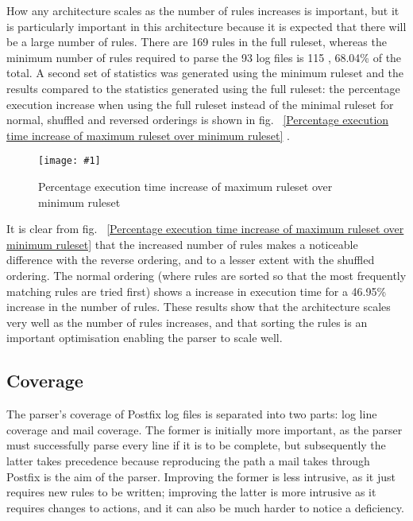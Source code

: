 \documentclass[draft]{svmult}
\newcommand{\showgraph}[3]{%
    \begin{figure}[hbt!]
        \caption{#2}\label{#3}
        \texttt{[image: \#1]}
    \end{figure}
}
\newcommand{\refwithpage}[1]{%
    \empty{}\vref{#1}%
}
\newcommand{\numberOFlogFILES}[0]{%
    93%
}
\newcommand{\numberOFrules}[0]{%
    169%
}
\newcommand{\numberOFrulesMINIMUM}[0]{%
    115%
}
\newcommand{\numberOFrulesMINIMUMpercentage}[0]{%
    68.04\%%
}
\newcommand{\numberOFrulesMAXIMUMpercentage}[0]{%
    46.95\%%
}
\begin{document}
How any architecture scales as the number of rules increases is important,
but it is particularly important in this architecture because it is
expected that there will be a large number of rules.  There are
\numberOFrules{} rules in the full ruleset, whereas the minimum number of
rules required to parse the \numberOFlogFILES{} log files is
\numberOFrulesMINIMUM{}, \numberOFrulesMINIMUMpercentage{} of the total.  A
second set of statistics was generated using the minimum ruleset and the
results compared to the statistics generated using the full ruleset: the
percentage execution increase when using the full ruleset instead of the
minimal ruleset for normal, shuffled and reversed orderings is shown in
fig.~\refwithpage{Percentage execution time increase of maximum ruleset
over minimum ruleset}.  \showgraph{build/plot-normal-vs-smaller}{Percentage
execution time increase of maximum ruleset over minimum ruleset}{Percentage
execution time increase of maximum ruleset over minimum ruleset}

It is clear from fig.~\refwithpage{Percentage execution time increase of
maximum ruleset over minimum ruleset} that the increased number of rules
makes a noticeable difference with the reverse ordering, and to a lesser
extent with the shuffled ordering.  The normal ordering (where rules are
sorted so that the most frequently matching rules are tried first) shows a
 increase in
execution time for a \numberOFrulesMAXIMUMpercentage{} increase in the
number of rules.  These results show that the architecture scales very well
as the number of rules increases, and that sorting the rules is an
important optimisation enabling the parser to scale well.

\subsection{Coverage}

\label{coverage}

The parser's coverage of Postfix log files is separated into two parts: log
line coverage and mail coverage.  The former is initially more important,
as the parser must successfully parse every line if it is to be complete,
but subsequently the latter takes precedence because reproducing the path a
mail takes through Postfix is the aim of the parser.  Improving the former
is less intrusive, as it just requires new rules to be written; improving
the latter is more intrusive as it requires changes to actions, and it can
also be much harder to notice a deficiency.
\end{document}
